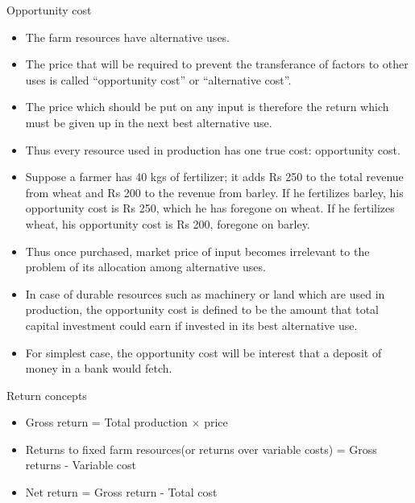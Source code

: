 \documentclass[12pt,ignorenonframetext,aspectratio=169]{beamer}
\providecommand{\tightlist}{%
  \setlength{\itemsep}{0pt}\setlength{\parskip}{0pt}}
\begin{document}
\begin{frame}{Opportunity cost}
\protect\hypertarget{opportunity-cost}{}
\begin{itemize}
\tightlist
\item
  The farm resources have alternative uses.
\item
  The price that will be required to prevent the transferance of factors
  to other uses is called ``opportunity cost'' or ``alternative cost''.
\item
  The price which should be put on any input is therefore the return
  which must be given up in the next best alternative use.
\item
  Thus every resource used in production has one true cost: opportunity
  cost.
\item
  Suppose a farmer has 40 kgs of fertilizer; it adds Rs 250 to the total
  revenue from wheat and Rs 200 to the revenue from barley. If he
  fertilizes barley, his opportunity cost is Rs 250, which he has
  foregone on wheat. If he fertilizes wheat, his opportunity cost is Rs
  200, foregone on barley.
\end{itemize}
\end{frame}

\begin{frame}{}
\protect\hypertarget{section}{}
\begin{itemize}
\tightlist
\item
  Thus once purchased, market price of input becomes irrelevant to the
  problem of its allocation among alternative uses.
\item
  In case of durable resources such as machinery or land which are used
  in production, the opportunity cost is defined to be the amount that
  total capital investment could earn if invested in its best
  alternative use.
\item
  For simplest case, the opportunity cost will be interest that a
  deposit of money in a bank would fetch.
\end{itemize}
\end{frame}

\begin{frame}{Return concepts}
\protect\hypertarget{return-concepts}{}
\begin{itemize}
\tightlist
\item
  Gross return = Total production \(\times\) price
\item
  Returns to fixed farm resources(or returns over variable costs) =
  Gross returns - Variable cost
\item
  Net return = Gross return - Total cost
\end{itemize}
\end{frame}
\end{document}
